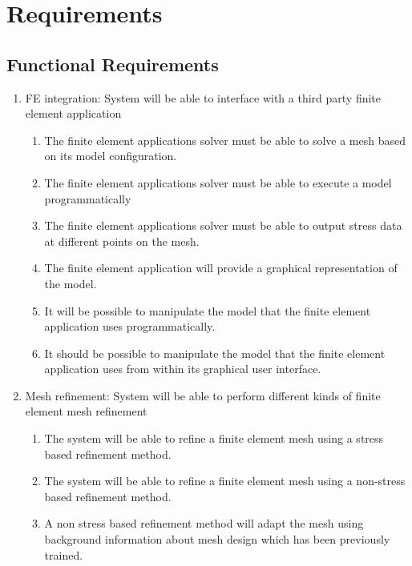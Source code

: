 \appendix


\section{Requirements}

\subsection{Functional Requirements}

\begin{enumerate}
\item FE integration: System will be able to interface with a third party finite element application

\begin{enumerate}
\item The finite element applications solver must be able to solve a mesh based on its model configuration.
\item The finite element applications solver must be able to execute a model programmatically
\item The finite element applications solver must be able to output stress data at different points on the mesh.
\item The finite element application will provide a graphical representation of the model.
\item It will be possible to manipulate the model that the finite element application uses programmatically.
\item It should be possible to manipulate the model that the finite element application uses from within its graphical user interface.
\end{enumerate}

\item Mesh refinement: System will be able to perform different kinds of finite element mesh refinement

\begin{enumerate}
\item The system will be able to refine a finite element mesh using a stress based refinement method.

\item The system will be able to refine a finite element mesh using a non-stress based refinement method.

\item A non stress based refinement method will adapt the mesh using background information about mesh design which has been previously trained.


\end{enumerate}
\end{enumerate}
